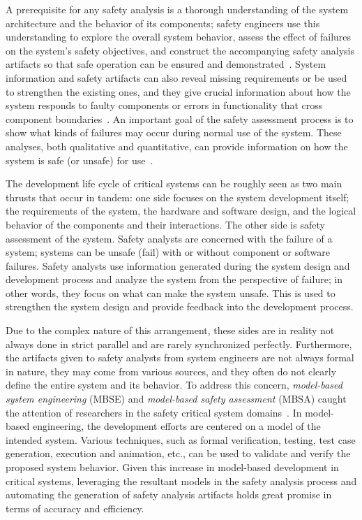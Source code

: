 A prerequisite for any safety analysis is a thorough understanding of the system architecture and the behavior of its components; safety engineers use this understanding to explore the overall system behavior, assess the effect of failures on the system's safety objectives, and construct the accompanying safety analysis artifacts so that safe operation can be ensured and demonstrated~\cite{SAE:ARP4761,SAE:ARP4754A}. System information and safety artifacts can also reveal missing requirements or be used to strengthen the existing ones, and they give crucial information about how the system responds to faulty components or errors in functionality that cross component boundaries~\cite{Bozzano:2010:DSA:1951720}.  An important goal of the safety assessment process is to show what kinds of failures may occur during normal use of the system. These analyses, both qualitative and quantitative, can provide information on how the system is safe (or unsafe) for use~\cite{roland1990system}.

The development life cycle of critical systems can be roughly seen as two main thrusts that occur in tandem: one side focuses on the system development itself; the requirements of the system, the hardware and software design, and the logical behavior of the components and their interactions. The other side is safety assessment of the system. Safety analysts are concerned with the failure of a system; systems can be unsafe (fail) with or without component or software failures. Safety analysts use information generated during the system design and development process and analyze the system from the perspective of failure; in other words, they focus on what can make the system unsafe. This is used to strengthen the system design and provide feedback into the development process.

Due to the complex nature of this arrangement, these sides are in reality not always done in strict parallel and are rarely synchronized perfectly. Furthermore, the artifacts given to safety analysts from system engineers are not always formal in nature, they may come from various sources, and they often do not clearly define the entire system and its behavior. To address this concern, \emph{model-based system engineering} (MBSE) and \emph{model-based safety assessment} (MBSA) caught the attention of researchers in the safety critical system domains~\cite{Joshi05:Dasc,CAV2015:BoCiGrMa,info17:HaLuHo,5979344,Gudemann:2010:FQQ:1909626.1909813}. In model-based engineering, the development efforts are centered on a model of the intended system. Various techniques, such as formal verification, testing, test case generation, execution and animation, etc., can be used to validate and verify the proposed system behavior. Given this increase in model-based development in critical systems, leveraging the resultant models in the safety analysis process and automating the generation of safety analysis artifacts holds great promise in terms of accuracy and efficiency. 

